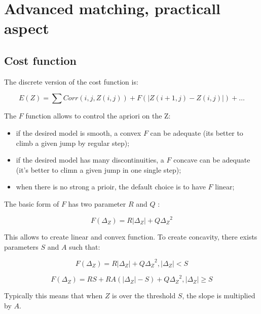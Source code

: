 \chapter{Advanced matching, practicall aspect}


\section{Cost function}


The discrete version of the cost function is:


\begin{equation}
   E(Z) = \sum Corr(i,j,Z(i,j)) + F(|Z(i+1,j)-Z(i,j)|)  + \dots
\end{equation}

The $F$ function allows to control the apriori on the Z:
 
\begin{itemize}
   \item  if the desired model is smooth, a convex   $F$  can be adequate (its better to
          climb a given jump by regular step);

   \item  if  the desired model has many discontinuities, a $F$   concave can be adequate 
          (it's better to climn a given jump in one single step);

   \item when there is no strong a prioir, the  default choice is to have $F$ linear;

\end{itemize}


The basic form of $F$ has two parameter $R$ and $Q$ :

\begin{equation}
   F(\Delta_Z) =  R |\Delta_Z| + Q {\Delta_Z}^2
\end{equation}


This allows to create linear and convex function. To create concavity,
there exists parameters $S$  and $A$ such that:

\begin{equation}
   F(\Delta_Z) =  R |\Delta_Z| + Q {\Delta_Z}^2 ,  |\Delta_Z| < S
\end{equation}

\begin{equation}
   F(\Delta_Z) =  R S +   R A (|\Delta_Z|-S)   + Q {\Delta_Z}^2 ,  |\Delta_Z| \geq  S
\end{equation}


Typically this means that when $Z$ is over the threshold $S$, the slope is multiplied by $A$.


